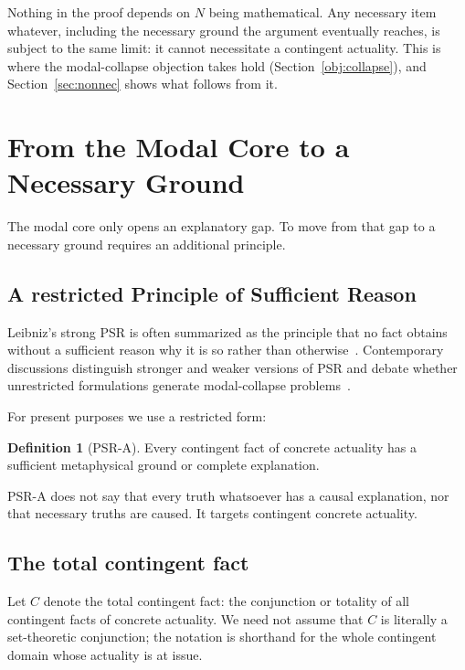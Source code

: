 \documentclass[11pt,letterpaper]{article}
\theoremstyle{plain}
\theoremstyle{definition}
\newtheorem{definition}{Definition}
\begin{document}
Nothing in the proof depends on $N$ being mathematical. Any necessary item whatever, including the necessary ground the argument eventually reaches, is subject to the same limit: it cannot necessitate a contingent actuality. This is where the modal-collapse objection takes hold (Section~\ref{obj:collapse}), and Section~\ref{sec:nonnec} shows what follows from it.

\section{From the Modal Core to a Necessary Ground}
\label{sec:fromcore}

The modal core only opens an explanatory gap. To move from that gap to a necessary ground requires an additional principle.

\subsection{A restricted Principle of Sufficient Reason}

Leibniz's strong PSR is often summarized as the principle that no fact obtains without a sufficient reason why it is so rather than otherwise~\cite{leibniz,melamed}. Contemporary discussions distinguish stronger and weaker versions of PSR and debate whether unrestricted formulations generate modal-collapse problems~\cite{pruss,oppy06,reichenbach}.

For present purposes we use a restricted form:

\begin{definition}[PSR-A]
Every contingent fact of concrete actuality has a sufficient metaphysical ground or complete explanation.
\end{definition}

PSR-A does not say that every truth whatsoever has a causal explanation, nor that necessary truths are caused. It targets contingent concrete actuality.

\subsection{The total contingent fact}

Let $C$ denote the total contingent fact: the conjunction or totality of all contingent facts of concrete actuality. We need not assume that $C$ is literally a set-theoretic conjunction; the notation is shorthand for the whole contingent domain whose actuality is at issue.
\end{document}
